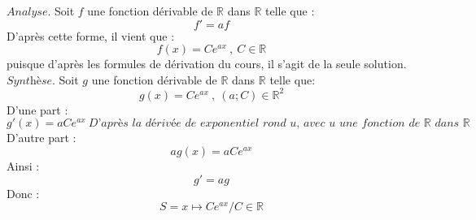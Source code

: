 \documentclass[a4paper,fleqn]{article}
\date{\today}
\begin{document}
$\textit{Analyse}$. Soit $f$ une fonction dérivable de $\mathbb{R}$ dans $\mathbb{R}$ telle que :
\[
	f' = af
\]
D'après cette forme, il vient que :
\[
	f(x) = Ce^{ax}~,~ C \in\mathbb{R}
\]
puisque d'après les formules de dérivation du cours, il s'agit de la seule solution. \\
$\textit{Synthèse}$. Soit $g$ une fonction dérivable de $\mathbb{R}$ dans $\mathbb{R}$ telle que:
\[
	g(x) = Ce^{ax}~,~ (a;C) \in \mathbb{R}^2
\]
D'une part :
\[
	g'(x) = aCe^{ax} ~\textit{D'après la dérivée de exponentiel rond u, avec u une fonction de }\mathbb{R}\textit{ dans }\mathbb{R}
\]
D'autre part :
\[
	ag(x) = aCe^{ax}
\]
Ainsi :
\[
	g'=ag
\]
Donc :
\[
	S= {x \mapsto Ce^{ax}/C\in\mathbb{R}}
\]
\end{document}

